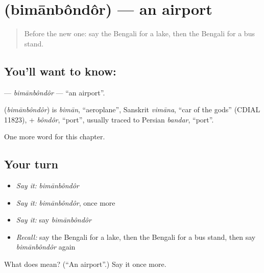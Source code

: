 \section[\texorpdfstring{\bn{বিমানবন্দর} (bimānbôndôr)}{বিমানবন্দর (bimānbôndôr)}]{ (bimānbôndôr) — an airport}

\label{lesson:BN-C217-bimanbondor}



\begin{quote}
Before the new one: say the Bengali for a lake, then the Bengali for a bus stand.
\end{quote}

\subsection*{You'll want to know: }
\textbf{} — \emph{bimānbôndôr} — \textquotedblleft{}an airport\textquotedblright{}.

\begin{cousinweb}
\textbf{} (\emph{bimānbôndôr}) is \emph{bimān}, \textquotedblleft{}aeroplane\textquotedblright{}, Sanskrit \emph{vimāna}, \textquotedblleft{}car of the gods\textquotedblright{} (CDIAL 11823), + \emph{bôndôr}, \textquotedblleft{}port\textquotedblright{}, usually traced to Persian \emph{bandar}, \textquotedblleft{}port\textquotedblright{}.
\end{cousinweb}

\begin{grammarlens}[title={What you've built}]
One more word for this chapter.
\end{grammarlens}

\subsection*{Your turn}
\begin{itemize}
\raggedright
  \item \emph{Say it:} \emph{bimānbôndôr}
  \item \emph{Say it:} \emph{bimānbôndôr}, once more
  \item \emph{Say it:} say \emph{bimānbôndôr}
  \item \emph{Recall:} say the Bengali for a lake, then the Bengali for a bus stand, then say \emph{bimānbôndôr} again
\end{itemize}

\begin{tcolorbox}[breakable,colback=teal!4,colframe=teal!35!black,title={Before you move on}]
What does  mean? (\textquotedblleft{}An airport\textquotedblright{}.) Say it once more.
\end{tcolorbox}
